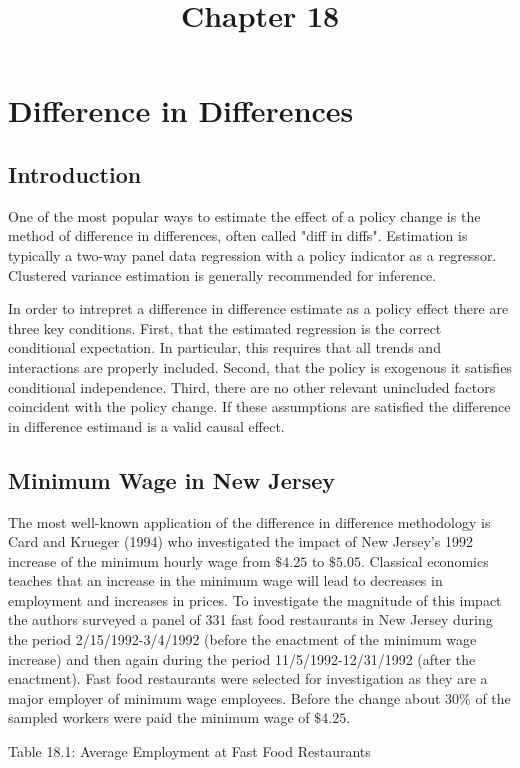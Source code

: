 \documentclass[10pt]{article}
\title{Chapter 18 }
\author{}
\date{}
\begin{document}
\maketitle
\section{Difference in Differences}
\subsection{Introduction}
One of the most popular ways to estimate the effect of a policy change is the method of difference in differences, often called "diff in diffs". Estimation is typically a two-way panel data regression with a policy indicator as a regressor. Clustered variance estimation is generally recommended for inference.

In order to intrepret a difference in difference estimate as a policy effect there are three key conditions. First, that the estimated regression is the correct conditional expectation. In particular, this requires that all trends and interactions are properly included. Second, that the policy is exogenous it satisfies conditional independence. Third, there are no other relevant unincluded factors coincident with the policy change. If these assumptions are satisfied the difference in difference estimand is a valid causal effect.

\subsection{Minimum Wage in New Jersey}
The most well-known application of the difference in difference methodology is Card and Krueger (1994) who investigated the impact of New Jersey's 1992 increase of the minimum hourly wage from $\$ 4.25$ to $\$ 5.05$. Classical economics teaches that an increase in the minimum wage will lead to decreases in employment and increases in prices. To investigate the magnitude of this impact the authors surveyed a panel of 331 fast food restaurants in New Jersey during the period 2/15/1992-3/4/1992 (before the enactment of the minimum wage increase) and then again during the period 11/5/1992-12/31/1992 (after the enactment). Fast food restaurants were selected for investigation as they are a major employer of minimum wage employees. Before the change about $30 \%$ of the sampled workers were paid the minimum wage of $\$ 4.25$.

Table 18.1: Average Employment at Fast Food Restaurants
\end{document}
